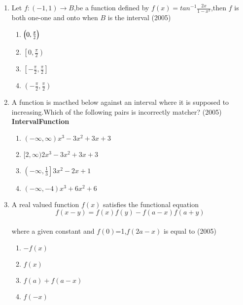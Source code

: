 \documentclass[journal,12pt,twocolumn]{IEEEtran}
\theoremstyle{remark}
\begin{document}
\begin{enumerate}[start=4]
      \item Let $f:(-1,1) \to B$,be a function defined by $f(x)=tan^{-1}\frac{2x}{1-x^{2}}$,then $f$ is both one-one and onto when $B$ is the interval \hfill(2005)
             \begin{enumerate}
		     \item $\left(0,\frac{\pi}{2}\right)$ \\
		     \item $\left[0,\frac{\pi}{2}\right)$ \\
		     \item $\left[-\frac{\pi}{2},\frac{\pi}{2}\right]$ \\
		     \item $\left(-\frac{\pi}{2},\frac{\pi}{2}\right)$
	     \end{enumerate}
     \item A function is macthed below against an interval where it is supposed to increasing.Which of the following pairs is incorrectly matcher? \hfill(2005)\\
	\textbf{Interval}\hfill \textbf{Function}
	     \begin{enumerate}
		     \item $(-\infty,\infty)$\hfill $x^{3}-3x^{2}+3x+3$ \\
		     \item $[2,\infty)$\hfill$2x^{3}-3x^{2}+3x+3$ \\
		     \item $\left(-\infty,\frac{1}{3}\right]$\hfill $3x^{2}-2x+1$ \\
		     \item $(-\infty,-4)$\hfill$x^{3}+6x^{2}+6$
	     \end{enumerate}
     \item A real valued function $f(x)$ satisfies the functional equation $$f(x-y)=f(x)f(y)-f(a-x)f(a+y)$$\\
	     where a given constant and $f(0)$=1,$f(2a-x)$ is equal to \hfill(2005)
	     \begin{enumerate}
		     \item $-f(x)$
		     \item $f(x)$
		     \item $f(a)+f(a-x)$
		     \item $f(-x)$
	     \end{enumerate}


\end{enumerate}
\end{document}

